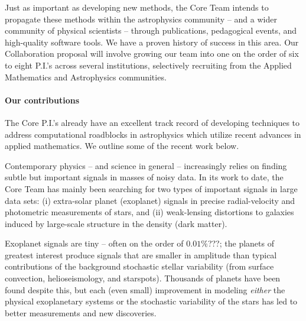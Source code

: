 \documentclass[12pt]{article}
\begin{document}
Just as important as developing new methods, the Core Team intends to
propagate these methods within the astrophysics community -- and a wider
community of physical scientists -- through publications, pedagogical
events, and high-quality software tools. 
We have a proven history of success in this area.
Our Collaboration proposal will involve growing our team into one on the
order of six to eight P.I.'s across several institutions, selectively
recruiting from the Applied Mathematics and Astrophysics communities.

\paragraph{Our contributions}


The Core P.I.'s already have an excellent track record of developing
techniques to address computational roadblocks in astrophysics which
utilize recent advances in applied mathematics. We outline some of the
recent work below.

Contemporary physics -- and science in general -- increasingly relies on
finding subtle but important signals in masses of noisy data.
In its work to date, the Core Team has mainly been searching for two
types of important signals in large data sets: (i) extra-solar planet
(exoplanet) signals in precise radial-velocity and photometric
measurements of stars, and (ii) weak-lensing distortions to galaxies
induced by large-scale structure in the density (dark matter).

Exoplanet signals are tiny -- often on the order of $0.01\%$???; the
planets of greatest interest produce signals that are smaller in
amplitude than typical contributions of the background stochastic
stellar variability (from surface convection, helioseismology, and
starspots).
Thousands of planets have been found despite this, but each (even small)
improvement in modeling {\em either} the physical exoplanetary systems
or the stochastic variability of the stars has led to better
measurements and new discoveries.
\end{document}

